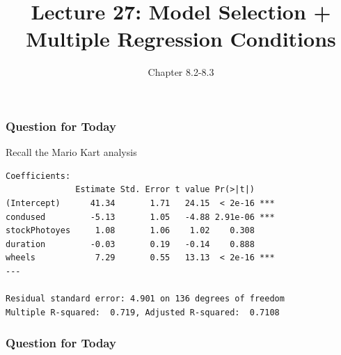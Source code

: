 \documentclass[handout]{beamer}
\title{Lecture 27: Model Selection + Multiple Regression Conditions}
\author{Chapter 8.2-8.3}
\date{}
\newcommand{\blue}[1]{\textcolor{blue2}{#1}}
\begin{document}
\begin{frame}
\titlepage
\end{frame}


\begin{frame}[fragile]
\frametitle{Question for Today}
Recall the Mario Kart analysis

\begin{small}
\begin{verbatim}
Coefficients:
              Estimate Std. Error t value Pr(>|t|)    
(Intercept)      41.34       1.71   24.15  < 2e-16 ***
condused         -5.13       1.05   -4.88 2.91e-06 ***
stockPhotoyes     1.08       1.06    1.02    0.308    
duration         -0.03       0.19   -0.14    0.888    
wheels            7.29       0.55   13.13  < 2e-16 ***
---

Residual standard error: 4.901 on 136 degrees of freedom
Multiple R-squared:  0.719,	Adjusted R-squared:  0.7108 
\end{verbatim}
\end{small}

\end{frame}


\begin{frame}[fragile]
\frametitle{Question for Today}

%
%
%
%
%
%
%
%

\end{frame}
\end{document}
